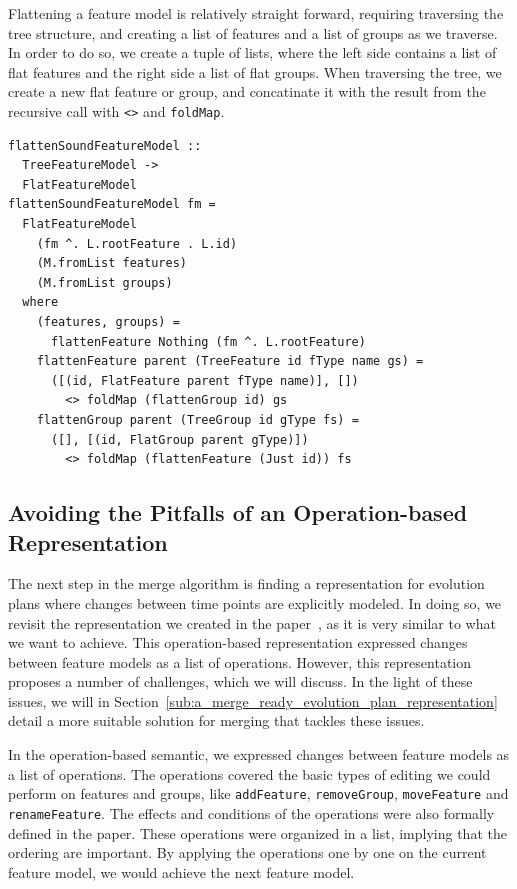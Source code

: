 \documentclass[a4paper,english]{ifimaster}
\begin{document}
Flattening a feature model is relatively straight forward, requiring traversing the tree structure, and creating a list of features and a list of groups as we traverse. In order to do so, we create a tuple of lists, where the left side contains a list of flat features and the right side a list of flat groups. When traversing the tree, we create a new flat feature or group, and concatinate it with the result from the recursive call with \texttt{<>} and \texttt{foldMap}.

\begin{verbatim}
flattenSoundFeatureModel :: 
  TreeFeatureModel -> 
  FlatFeatureModel
flattenSoundFeatureModel fm =
  FlatFeatureModel
    (fm ^. L.rootFeature . L.id)
    (M.fromList features)
    (M.fromList groups)
  where
    (features, groups) = 
      flattenFeature Nothing (fm ^. L.rootFeature)
    flattenFeature parent (TreeFeature id fType name gs) =
      ([(id, FlatFeature parent fType name)], [])
        <> foldMap (flattenGroup id) gs
    flattenGroup parent (TreeGroup id gType fs) =
      ([], [(id, FlatGroup parent gType)])
        <> foldMap (flattenFeature (Just id)) fs
\end{verbatim}

\subsection{Avoiding the Pitfalls of an Operation-based Representation}%
\label{sub:avoiding_the_pitfalls_of_an_operation_based_representation}

The next step in the merge algorithm is finding a representation for evolution plans where changes between time points are explicitly modeled. In doing so, we revisit the representation we created in the paper~\cite{cite:consistency_preserving_evolution_planning}, as it is very similar to what we want to achieve. This operation-based representation expressed changes between feature models as a list of operations. However, this representation proposes a number of challenges, which we will discuss. In the light of these issues, we will in Section~\vref{sub:a_merge_ready_evolution_plan_representation} detail a more suitable solution for merging that tackles these issues.

In the operation-based semantic, we expressed changes between feature models as a list of operations. The operations covered the basic types of editing we could perform on features and groups, like \texttt{addFeature}, \texttt{removeGroup}, \texttt{moveFeature} and \texttt{renameFeature}. The effects and conditions of the operations were also formally defined in the paper. These operations were organized in a list, implying that the ordering are important. By applying the operations one by one on the current feature model, we would achieve the next feature model.
\end{document}
